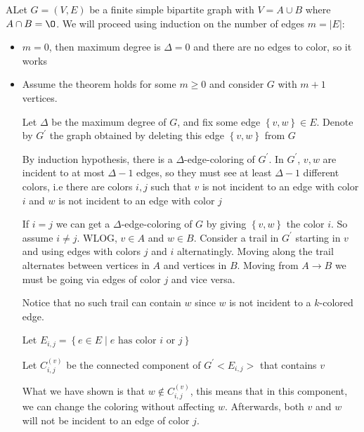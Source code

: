 \begin{prf}
  ALet $G = (V,E)$ be a finite simple bipartite graph with $V = A\cup B$ where $A\cap B =\O$. We will proceed using induction on the number of edges $m = \left|E\right|$:\par
  \begin{itemize}
    \item $m = 0$, then maximum degree is $\Delta = 0$ and there are no edges to color, so it works
      \par\bigskip
    \item Assume the theorem holds for some $m\geq0$ and consider $G$ with $m+1$ vertices.\par
    \noindent Let $\Delta$ be the maximum degree of $G$, and fix some edge $\left\{v,w\right\}\in E$. Denote by $G^{\prime}$ the graph obtained by deleting this edge $\left\{v,w\right\}$ from $G$
    \par\bigskip
    \noindent By induction hypothesis, there is a $\Delta$-edge-coloring of $G^{\prime}$. In $G^{\prime}$, $v,w$ are incident to at most $\Delta-1$ edges, so they must see at least $\Delta-1$  different colors, i.e there are colors $i,j$ such that $v$ is not incident to an edge with color $i$ and $w$ is not incident to an edge with color $j$ 
    \par\bigskip
  \noindent If $i=j$ we can get a $\Delta$-edge-coloring of $G$ by giving $\left\{v,w\right\}$  the color $i$. So assume $i\neq j$. WLOG, $v\in A$ and $w\in B$. Consider a trail in $G^{\prime}$ starting in $v$ and using edges with colors $j$ and $i$ alternatingly. Moving along the trail alternates between vertices in $A$ and vertices in $B$. Moving from $A\to B$ we must be going via edges of color $j$  and vice versa.
  \par\bigskip
  \noindent Notice that no such trail can contain $w$ since $w$ is not incident to a $k$-colored edge.
  \par\bigskip
  \noindent Let $E_{i,j} = \left\{e\in E\;|\;\text{$e$ has color $i$ or $j$}\right\}$\par
  \noindent Let $C_{i,j}^{(v)}$ be the connected component of $G^{\prime}<E_{i,j}>$ that contains $v$
  \par\bigskip
  \noindent What we have shown is that $w\not\in C_{i,j}^{(v)}$, this means that in this component, we can change the coloring without affecting $w$. Afterwards, both $v$ and $w$ will not be incident to an edge of color $j$.
  \end{itemize}
\end{prf}
